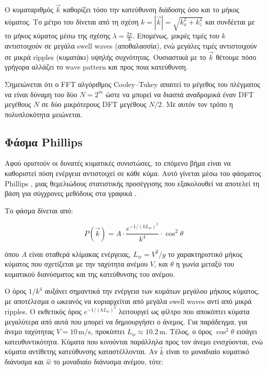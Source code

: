 \documentclass[a4paper, 11pt]{article}
\begin{document}
Ο κυματαριθμός \(\vec{k}\) καθορίζει τόσο την κατεύθυνση διάδοσης όσο
και το μήκος κύματος. Το μέτρο του δίνεται από τη σχέση
\(k = |\vec{k}| = \sqrt{k_x^2 + k_z^2}\) και συνδέεται με το μήκος
κύματος μέσω της σχέσης \(\lambda = \frac{2\pi}{k}\). Επομένως, μικρές
τιμές του \(k\) αντιστοιχούν σε μεγάλα swell waves (αποθαλασσία), ενώ
μεγάλες τιμές αντιστοιχούν σε μικρά ripples (κυματάκι) υψηλής
συχνότητας. Ουσιαστικά με το \(\vec{k}\) θέτουμε πόσο γρήγορα αλλάζει το
wave pattern και προς ποια κατεύθυνση.

Σημειώνεται ότι ο FFT αλγόριθμος Cooley--Tukey απαιτεί το μέγεθος του
πλέγματος να είναι δύναμη του δύο \(N = 2^m\) ώστε να μπορεί να διασπά
αναδρομικά έναν DFT μεγέθους \(N\) σε δύο μικρότερους DFT μεγέθους
\(N/2\). Με αυτόν τον τρόπο η πολυπλοκότητα μειώνεται.

\subsection{Φάσμα Phillips}\label{ux3c6ux3acux3c3ux3bcux3b1-phillips}

Αφού οριστούν οι δυνατές κυματικές συνιστώσες, το επόμενο βήμα είναι να
καθοριστεί πόση ενέργεια αντιστοιχεί σε κάθε κύμα. Αυτό γίνεται μέσω του
φάσματος Phillips \cite{phillips1957}, μιας θεμελιώδους στατιστικής
προσέγγισης που εξακολουθεί να αποτελεί τη βάση για σύγχρονες μεθόδους
στα γραφικά \cite{horvath2015}.

Το φάσμα δίνεται από:

\[
P(\vec{k}) =
A
\cdot
\frac{e^{-1/(kL_w)^2}}{k^4}
\cdot
\cos^2\theta
\]

όπου \(A\) είναι σταθερά κλίμακας ενέργειας, \(L_w = V^2/g\) το
χαρακτηριστικό μήκος κύματος που σχετίζεται με την ταχύτητα ανέμου
\(V\), και \(\theta\) η γωνία μεταξύ του κυματικού διανύσματος και της
κατεύθυνσης του ανέμου.

Ο όρος \(1/k^4\) αυξάνει σημαντικά την ενέργεια των κυμάτων μεγάλου
μήκους κύματος, με αποτέλεσμα ο ωκεανός να κυριαρχείται από μεγάλα swell
waves αντί από μικρά ripples. Ο εκθετικός όρος \(e^{-1/(kL_w)^2}\)
λειτουργεί ως φίλτρο που αποκόπτει κύματα μεγαλύτερα από αυτά που μπορεί
να δημιουργήσει ο άνεμος. Για παράδειγμα, για άνεμο ταχύτητας
\(V=10\,\text{m/s}\), προκύπτει \(L_w \approx 10.2\,\text{m}\). Τέλος, ο
όρος \(\cos^2\theta\) εισάγει κατευθυντικότητα. Κύματα που κινούνται
παράλληλα προς τον άνεμο ενισχύονται, ενώ κύματα αντίθετης κατεύθυνσης
καταστέλλονται. Αν \(\hat{k}\) είναι το μοναδιαίο κυματικό διάνυσμα και
\(\hat{w}\) το μοναδιαίο διάνυσμα ανέμου, τότε:
\end{document}
